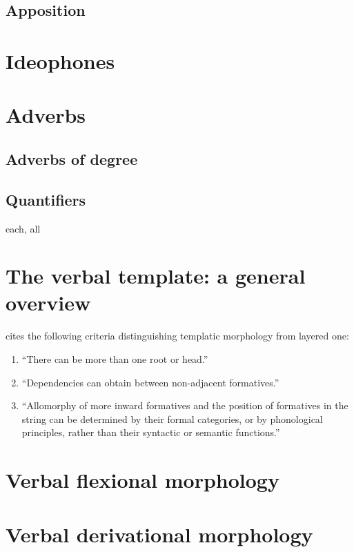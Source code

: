 \documentclass[oldfontcommands,oneside,a4paper,11pt]{memoir}
\begin{document}
\section{Apposition}
 

\chapter{Ideophones}
 

\chapter{Adverbs}
\section{Adverbs of degree} \label{adv:degree}
 

\section{Quantifiers}
each, all
 

 
 
\chapter{The verbal template: a general overview} \label{chapt:template}
 \cite[218]{bickel07inflectional} cites the following criteria distinguishing templatic morphology from layered one: 

\begin{enumerate}
\item ``There can be more than one root or head.''
\item ``Dependencies can obtain between non-adjacent formatives.''
\item ``Allomorphy of more inward formatives and the position of formatives in the string can be determined by their formal categories, or by phonological principles, rather than their syntactic or semantic functions.''
\end{enumerate}
\chapter{Verbal flexional morphology}    
 


\chapter{Verbal derivational morphology} \label{chapt:derivational}
\end{document}
